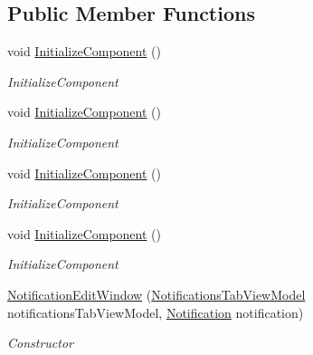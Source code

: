 \subsection*{Public Member Functions}
\begin{DoxyCompactItemize}
\item 
void \hyperlink{class_baudi_1_1_client_1_1_view_1_1_edit_windows_1_1_notification_edit_window_a6180ff3d0a432d8fd0d6de5fb5ba0c73}{Initialize\+Component} ()
\begin{DoxyCompactList}\small\item\em Initialize\+Component \end{DoxyCompactList}\item 
void \hyperlink{class_baudi_1_1_client_1_1_view_1_1_edit_windows_1_1_notification_edit_window_a6180ff3d0a432d8fd0d6de5fb5ba0c73}{Initialize\+Component} ()
\begin{DoxyCompactList}\small\item\em Initialize\+Component \end{DoxyCompactList}\item 
void \hyperlink{class_baudi_1_1_client_1_1_view_1_1_edit_windows_1_1_notification_edit_window_a6180ff3d0a432d8fd0d6de5fb5ba0c73}{Initialize\+Component} ()
\begin{DoxyCompactList}\small\item\em Initialize\+Component \end{DoxyCompactList}\item 
void \hyperlink{class_baudi_1_1_client_1_1_view_1_1_edit_windows_1_1_notification_edit_window_a6180ff3d0a432d8fd0d6de5fb5ba0c73}{Initialize\+Component} ()
\begin{DoxyCompactList}\small\item\em Initialize\+Component \end{DoxyCompactList}\item 
\hyperlink{class_baudi_1_1_client_1_1_view_1_1_edit_windows_1_1_notification_edit_window_ae039f79c4e618fdb67f0377c226f1116}{Notification\+Edit\+Window} (\hyperlink{class_baudi_1_1_client_1_1_view_models_1_1_tabs_view_models_1_1_notifications_tab_view_model}{Notifications\+Tab\+View\+Model} notifications\+Tab\+View\+Model, \hyperlink{class_baudi_1_1_d_a_l_1_1_models_1_1_notification}{Notification} notification)
\begin{DoxyCompactList}\small\item\em Constructor \end{DoxyCompactList}\end{DoxyCompactItemize}


